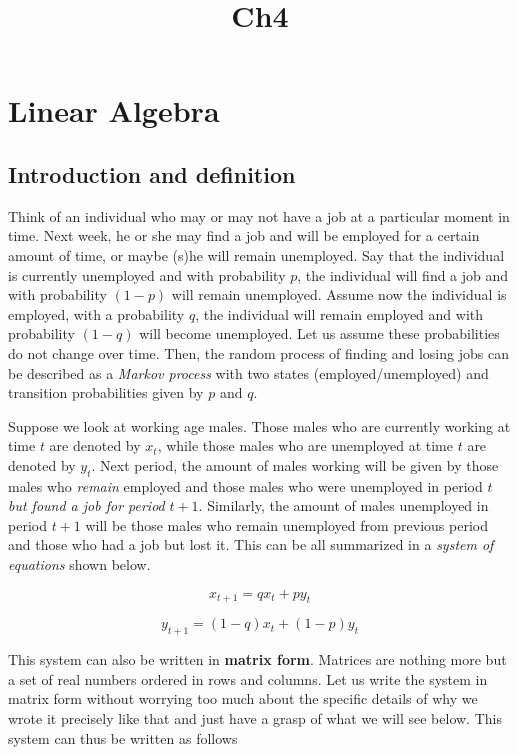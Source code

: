 \documentclass[11pt]{article}
\title{Ch4}
\begin{document}
    
    
    \maketitle
    
    

    
    \hypertarget{linear-algebra}{%
\section{Linear Algebra}\label{linear-algebra}}

\hypertarget{introduction-and-definition}{%
\subsection{Introduction and
definition}\label{introduction-and-definition}}

Think of an individual who may or may not have a job at a particular
moment in time. Next week, he or she may find a job and will be employed
for a certain amount of time, or maybe (s)he will remain unemployed. Say
that the individual is currently unemployed and with probability \(p\),
the individual will find a job and with probability \((1-p)\) will
remain unemployed. Assume now the individual is employed, with a
probability \(q\), the individual will remain employed and with
probability \((1-q)\) will become unemployed. Let us assume these
probabilities do not change over time. Then, the random process of
finding and losing jobs can be described as a \emph{Markov process} with
two states (employed/unemployed) and transition probabilities given by
\(p\) and \(q\).

Suppose we look at working age males. Those males who are currently
working at time \(t\) are denoted by \(x_t\), while those males who are
unemployed at time \(t\) are denoted by \(y_t\). Next period, the amount
of males working will be given by those males who \emph{remain} employed
and those males who were unemployed in period \(t\)
\emph{but found a job for period} \(t+1\). Similarly, the amount of
males unemployed in period \(t+1\) will be those males who remain
unemployed from previous period and those who had a job but lost it.
This can be all summarized in a \emph{system of equations} shown below.

\[
x_{t+1} = q x_t + p y_t
\]

\[
y_{t+1} = (1-q) x_t + (1-p)y_t
\]

This system can also be written in \textbf{matrix form}. Matrices are
nothing more but a set of real numbers ordered in rows and columns. Let
us write the system in matrix form without worrying too much about the
specific details of why we wrote it precisely like that and just have a
grasp of what we will see below. This system can thus be written as
follows
\end{document}

